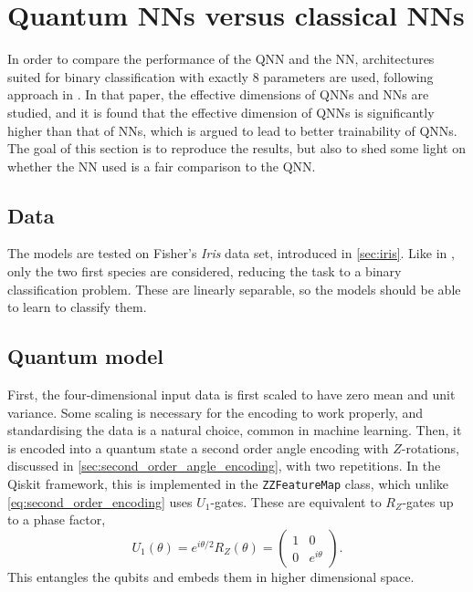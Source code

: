 \section{Quantum NNs versus classical NNs}
\label{sec:qnn-vs-nn}

In order to compare the performance of the QNN and the NN, architectures suited for binary classification with exactly 8 parameters are used, following approach in \cite{abbas2021}.
In that paper, the effective dimensions of QNNs and NNs are studied, and it is found that the effective dimension of QNNs is significantly higher than that of NNs, which is argued to lead to better trainability of QNNs.
The goal of this section is to reproduce the results, but also to shed some light on whether the NN used is a fair comparison to the QNN.

\subsection{Data}
The models are tested on Fisher's \textit{Iris} data set, introduced in \cref{sec:iris}.
Like in \cite{abbas2021}, only the two first species are considered, reducing the task to a binary classification problem.
These are linearly separable, so the models should be able to learn to classify them.

\subsection{Quantum model}
First, the four-dimensional input data is first scaled to have zero mean and unit variance.
Some scaling is necessary for the encoding to work properly, and standardising the data is a natural choice, common in machine learning.
Then, it is encoded into a quantum state a second order angle encoding with $Z$-rotations, discussed in \cref{sec:second_order_angle_encoding}, with two repetitions.
In the Qiskit framework, this is implemented in the \texttt{ZZFeatureMap} class, which unlike \cref{eq:second_order_encoding} uses $U_1$-gates.
These are equivalent to $R_Z$-gates up to a phase factor,
\begin{equation}
    U_1(\theta)
    = e^{i\theta/2} R_Z(\theta)
    = \begin{pmatrix} 1 & 0 \\ 0 & e^{i\theta} \end{pmatrix}.
\end{equation}
This entangles the qubits and embeds them in higher dimensional space.

